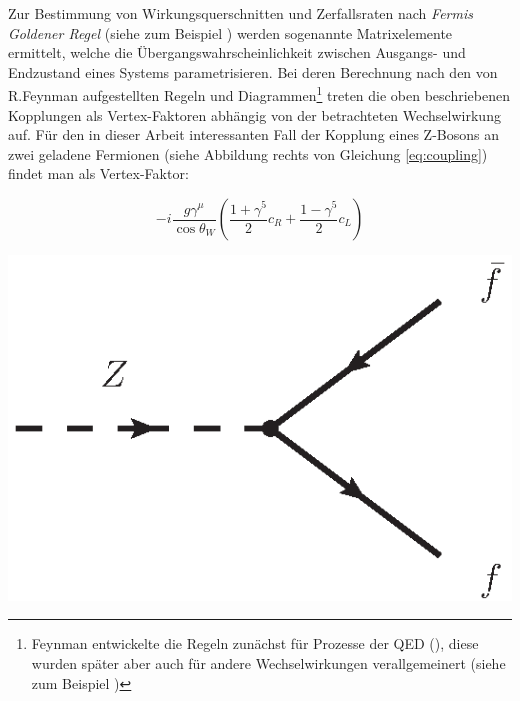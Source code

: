 Zur Bestimmung von Wirkungsquerschnitten und Zerfallsraten nach \textit{Fermis
Goldener Regel} (siehe zum Beispiel \cite{Griffiths:2008zz}) werden sogenannte
Matrixelemente ermittelt, welche die Übergangswahrscheinlichkeit zwischen
Ausgangs- und Endzustand eines Systems parametrisieren. Bei deren Berechnung
nach den von R.Feynman aufgestellten Regeln und Diagrammen\footnote{Feynman
entwickelte die Regeln zunächst für Prozesse der \ac{QED}
(\cite{Feynman:1949zx}), diese wurden später aber auch für andere
Wechselwirkungen verallgemeinert (siehe zum Beispiel \cite{Griffiths:2008zz})}
treten die oben beschriebenen Kopplungen als Vertex-Faktoren abhängig von der
betrachteten Wechselwirkung auf. Für den in dieser Arbeit interessanten Fall
der Kopplung eines Z-Bosons an zwei geladene Fermionen (siehe Abbildung
rechts von Gleichung \ref{eq:coupling}) findet man als Vertex-Faktor:\\
\begin{minipage}{0.6\textwidth}
\begin{equation}
    -i \frac{g\gamma^\mu}{\cos\theta_W} \left( \frac{1+\gamma^5}{2} c_R
        + \frac{1-\gamma^5}{2} c_L \right)
    \label{eq:coupling}
\end{equation}
\end{minipage}
\hfill
\begin{minipage}{0.3\textwidth}
    \includegraphics[width=1.0\textwidth]{img/NCvertex}
\end{minipage}
\newline

